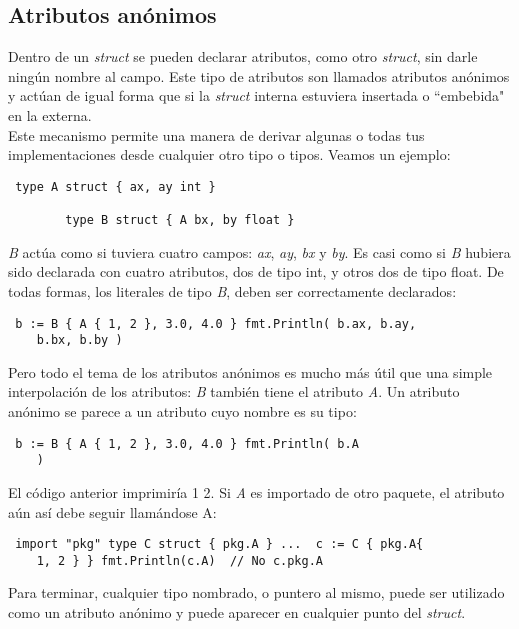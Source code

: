 	\subsection{Atributos anónimos}
	
	Dentro de un \textit{struct} se pueden declarar atributos, como otro
	\textit{struct}, sin darle ningún nombre al campo. Este tipo de atributos
	son llamados atributos anónimos y actúan de igual forma que si la
	\textit{struct} interna estuviera insertada o ``embebida" en la externa.\\
	
	Este mecanismo permite una manera de derivar algunas o todas tus
	implementaciones desde cualquier otro tipo o tipos. Veamos un ejemplo:
	
	\begin{verbatim} type A struct { ax, ay int }
	    
		type B struct { A bx, by float } \end{verbatim}
	
	\textit{B} actúa como si tuviera cuatro campos: \textit{ax}, \textit{ay},
	\textit{bx} y \textit{by}. Es casi como si \textit{B} hubiera sido declarada
	con cuatro atributos, dos de tipo int, y otros dos de tipo float. De todas
	formas, los literales de tipo \textit{B}, deben ser correctamente
	declarados:
	
	\begin{verbatim} b := B { A { 1, 2 }, 3.0, 4.0 } fmt.Println( b.ax, b.ay,
	b.bx, b.by ) \end{verbatim}
	
	Pero todo el tema de los atributos anónimos es mucho más útil que una simple
	interpolación de los atributos: \textit{B} también tiene el atributo
	\textit{A}. Un atributo anónimo se parece a un atributo cuyo nombre es su
	tipo:
	
	\begin{verbatim} b := B { A { 1, 2 }, 3.0, 4.0 } fmt.Println( b.A
	) \end{verbatim}
	
	El código anterior imprimiría {1 2}. Si \textit{A} es importado de otro
	paquete, el atributo aún así debe seguir llamándose A:
	
	\begin{verbatim} import "pkg" type C struct { pkg.A } ...  c := C { pkg.A{
	1, 2 } } fmt.Println(c.A)  // No c.pkg.A \end{verbatim}
	
	Para terminar, cualquier tipo nombrado, o puntero al mismo, puede ser
	utilizado como un atributo anónimo y puede aparecer en cualquier punto del
	\textit{struct}.
	
